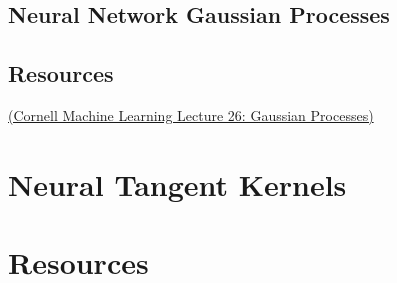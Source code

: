\documentclass[answers,12pt]{exam}
\begin{document}
\subsection{Neural Network Gaussian Processes}

\subsection{Resources} 
\href{https://www.cs.cornell.edu/courses/cs4780/2018fa/lectures/lecturenote15.html}{(Cornell Machine Learning Lecture 26: Gaussian Processes)}

\section{Neural Tangent Kernels}

\section{Resources}
\end{document}
